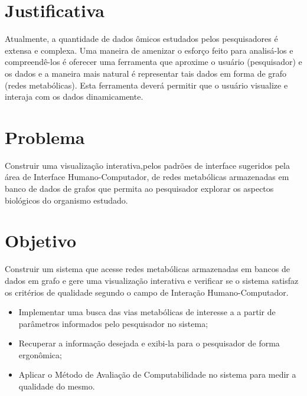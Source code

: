 \section{Justificativa}
\indent Atualmente, a quantidade de dados ômicos estudados pelos pesquisadores é extensa e complexa. Uma maneira de amenizar o esforço feito para analisá-los e compreendê-los é oferecer uma ferramenta que aproxime o usuário (pesquisador) e os dados e a maneira mais natural é representar tais dados em forma de grafo (redes metabólicas). Esta ferramenta deverá permitir que o usuário visualize e interaja com os dados dinamicamente.

\section{Problema}
\indent Construir uma visualização interativa,pelos padrões de interface sugeridos pela área de Interface Humano-Computador, de redes metabólicas armazenadas em banco de dados de grafos que permita ao pesquisador explorar os aspectos biológicos do organismo estudado.

\section{Objetivo}
\indent Construir um sistema que acesse redes metabólicas armazenadas em bancos de dados em grafo e gere uma visualização interativa e verificar se o sistema satisfaz os critérios de qualidade segundo o campo de Interação Humano-Computador.
\begin{itemize}
 \item Implementar uma busca das vias metabólicas de interesse a a partir de parâmetros informados pelo pesquisador no sistema;
 \item Recuperar a informação desejada e exibi-la para o pesquisador de forma ergonômica;
 \item Aplicar o Método de Avaliação de Computabilidade no sistema para medir a qualidade do mesmo.
\end{itemize}

